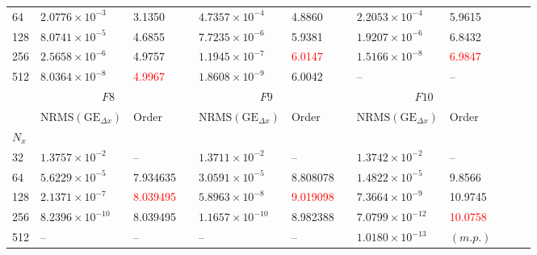 \documentclass{beamer}
\begin{document}
\begin{frame}
\begin{tabular}{@{}lllcllcllcll@{}}
\phantom{a}64	& $2.0776\times 10^{-3}$	&	3.1350		                && $4.7357\times 10^{-4}$	&	4.8860            		&&	$2.2053\times 10^{-4}$	&	5.9615               	        \\
\phantom{a}128	& $8.0741\times 10^{-5}$	&	4.6855		                && $7.7235\times 10^{-6}$	&	5.9381                		&&	$1.9207\times 10^{-6}$	&	6.8432          		\\
\phantom{a}256	& $2.5658\times 10^{-6}$	&	4.9757	                     	&& $1.1945\times 10^{-7}$	&	\textcolor{red}{6.0147}		&&	$1.5166\times 10^{-8}$	&	\textcolor{red}{6.9847}		\\
\phantom{a}512	& $8.0364\times 10^{-8}$	&	\textcolor{red}{4.9967}	        && $1.8608\times 10^{-9}$	&	6.0042           		&&	--	                &	--              		\\
\midrule
&\multicolumn{2}{c}{$F8$} & \phantom{abc} & \multicolumn{2}{c}{$F9$} &
\phantom{abc} & \multicolumn{2}{c}{$F10$} & \\
\cmidrule{2-3} \cmidrule{5-6} \cmidrule{8-9} 
& $\text{NRMS}(\text{GE}_{\Delta x})$ & Order && $\text{NRMS}(\text{GE}_{\Delta x})$ & Order && $\text{NRMS}(\text{GE}_{\Delta x})$ & Order  & \\
\midrule
\phantom{a}$N_x$ \\
\phantom{a}32	&	$1.3757\times 10^{-2}$	&	--	                  &&  $1.3711\times 10^{-2}$	&	--	    &&    $1.3742\times 10^{-2}$	&	--        \\
\phantom{a}64	&	$5.6229\times 10^{-5}$	&	7.934635	          &&  $3.0591\times 10^{-5}$	&	8.808078	    &&    $1.4822\times 10^{-5}$	&	9.8566    \\
\phantom{a}128	&	$2.1371\times 10^{-7}$	&	\textcolor{red}{8.039495} &&  $5.8963\times 10^{-8}$	&	\textcolor{red}{9.019098}		  &&    $7.3664\times 10^{-9}$	&	10.9745 	\\
\phantom{a}256	&	$8.2396\times 10^{-10}$	&	8.039495                  &&  $1.1657\times 10^{-10}$	&	8.982388		  &&    $7.0799\times 10^{-12}$	&	\textcolor{red}{10.0758}	\\
\phantom{a}512	&	--	                &	--		          &&         --	                &	--		  &&    $1.0180\times 10^{-13}$	&	$(m.p.)$	\\
\bottomrule[2 pt]
\end{tabular}

\end{frame}

\end{document}
